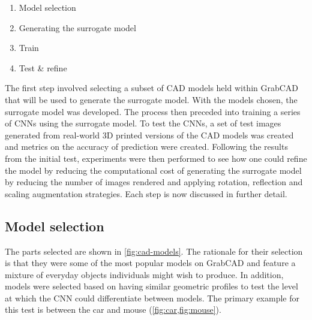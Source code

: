 \documentclass[a4paper, 11pt]{article}
\begin{document}
\begin{enumerate}
  \item Model selection
  \item Generating the surrogate model
  \item Train
  \item Test \& refine
\end{enumerate}

The first step involved selecting a subset of CAD models held within GrabCAD that will be used to generate the surrogate model. With the models chosen, the surrogate model was developed. The process then preceded into training a series of CNNs using the surrogate model. To test the CNNs, a set of test images generated from real-world 3D printed versions of the CAD models was created and metrics on the accuracy of prediction were created. Following the results from the initial test, experiments were then performed to see how one could refine the model by reducing the computational cost of generating the surrogate model by reducing the number of images rendered and applying rotation, reflection and scaling augmentation strategies. Each step is now discussed in further detail.

\subsection{Model selection}

The parts selected are shown in \cref{fig:cad-models}. The rationale for their selection is that they were some of the most popular models on GrabCAD and feature a mixture of everyday objects individuals might wish to produce. In addition, models were selected based on having similar geometric profiles to test the level at which the CNN could differentiate between models. The primary example for this test is between the car and mouse (\cref{fig:car,fig:mouse}).
\end{document}
